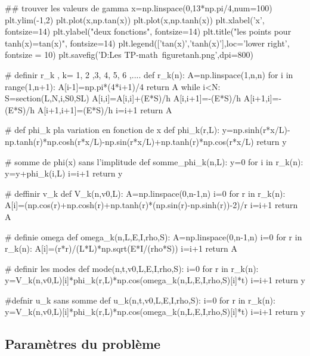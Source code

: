 \documentclass[a4paper,10pt]{report} %
\begin{document}
\begin{python}
##  trouver les valeurs de gamma
x=np.linspace(0,13*np.pi/4,num=100)
plt.ylim(-1,2) 
plt.plot(x,np.tan(x))
plt.plot(x,np.tanh(x))
plt.xlabel('x', fontsize=14)      
plt.ylabel("deux fonctions", fontsize=14)
plt.title("les points pour tanh(x)=tan(x)", fontsize=14)
plt.legend(['tan(x)','tanh(x)'],loc='lower right', fontsize = 10)
plt.savefig('D:\Tous Les TP\DM-math\ figuretanh.png',dpi=800)



#   definir r_k , k= 1, 2 ,3, 4, 5, 6 ,....
def r_k(n):
    A=np.linspace(1,n,n)
    for i in range(1,n+1):
        A[i-1]=np.pi*(4*i+1)/4
    return A
    while i<N:
        S=section(L,N,i,S0,SL)
        A[i,i]=A[i,i]+(E*S)/h
        A[i,i+1]=-(E*S)/h
        A[i+1,i]=-(E*S)/h
        A[i+1,i+1]=(E*S)/h
        i=i+1
    return A


#   def phi_k pla variation en fonction de x 
def phi_k(r,L):
    y=np.sinh(r*x/L)-np.tanh(r)*np.cosh(r*x/L)-np.sin(r*x/L)+np.tanh(r)*np.cos(r*x/L)
    return y
    
    
#  somme de  phi(x) sans l'implitude 
def somme_phi_k(n,L):
    y=0
    for i in r_k(n):
        y=y+phi_k(i,L)
        i=i+1
    return y
    

# deffinir v_k    
def V_k(n,v0,L):
    A=np.linspace(0,n-1,n)
    i=0
    for r in r_k(n):
        A[i]=(np.cos(r)+np.cosh(r)+np.tanh(r)*(np.sin(r)-np.sinh(r))-2)/r
        i=i+1
    return A
    
    

# definie omega
def omega_k(n,L,E,I,rho,S):
    A=np.linspace(0,n-1,n)
    i=0
    for r in r_k(n):
        A[i]=(r*r)/(L*L)*np.sqrt(E*I/(rho*S))
        i=i+1
    return A
    

#  definir les modes
def mode(n,t,v0,L,E,I,rho,S):
    i=0
    for r in r_k(n):
        y=V_k(n,v0,L)[i]*phi_k(r,L)*np.cos(omega_k(n,L,E,I,rho,S)[i]*t)
        i=i+1
    return y
    
    

#defnir u_k sans somme
def u_k(n,t,v0,L,E,I,rho,S):
    i=0
    for r in r_k(n):
        y=V_k(n,v0,L)[i]*phi_k(r,L)*np.cos(omega_k(n,L,E,I,rho,S)[i]*t)
        i=i+1
    return y
    
    

\end{python}

\subsection{Paramètres du problème}
\end{document}
